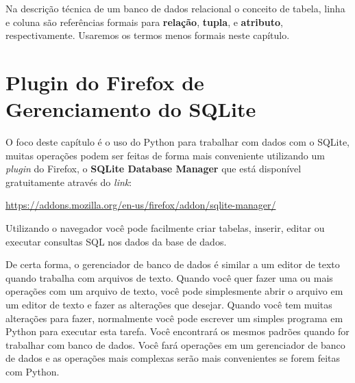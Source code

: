 
Na descrição técnica de um banco de dados relacional o conceito de
tabela, linha e coluna são referências formais para {\bf relação},
{\bf tupla}, e {\bf atributo}, respectivamente.
Usaremos os termos menos formais neste capítulo.

\section{Plugin do Firefox de Gerenciamento do SQLite}

O foco deste capítulo é o uso do Python para trabalhar com dados
com o SQLite, muitas operações podem ser feitas de forma mais
conveniente utilizando um {\it plugin} do Firefox, o {\bf SQLite
  Database Manager} que está disponível gratuitamente através do {\it link}:

\url{https://addons.mozilla.org/en-us/firefox/addon/sqlite-manager/}


Utilizando o navegador você pode facilmente criar tabelas, inserir, editar ou
executar consultas SQL nos dados da base de dados.


De certa forma, o gerenciador de banco de dados é similar a um editor de texto
quando trabalha com arquivos de texto. Quando você quer fazer uma ou mais
operações com um arquivo de texto, você pode simplesmente abrir o arquivo em
um editor de texto e fazer as alterações que desejar. Quando você tem
muitas alterações para fazer, normalmente você pode escrever um simples programa em 
Python para executar esta tarefa. Você encontrará os mesmos padrões
quando for trabalhar com banco de dados. Você fará operações em um gerenciador
de banco de dados e as operações mais complexas serão mais convenientes se
forem feitas com Python.

